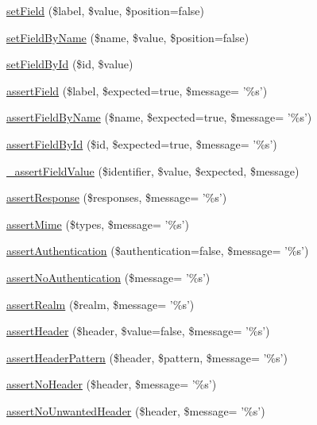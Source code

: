 \begin{DoxyCompactItemize}
\item 
\hyperlink{class_web_test_case_a2b8f21394a225f1386c22f671a6debc0}{setField} (\$label, \$value, \$position=false)
\item 
\hyperlink{class_web_test_case_ab3d6b5e72b290f14f51148642f1681e4}{setFieldByName} (\$name, \$value, \$position=false)
\item 
\hyperlink{class_web_test_case_a677f77692fd67768ad837a258a7ef4fd}{setFieldById} (\$id, \$value)
\item 
\hyperlink{class_web_test_case_a2ff4ade56d51b73cd30290456ee94d74}{assertField} (\$label, \$expected=true, \$message= '\%s')
\item 
\hyperlink{class_web_test_case_abfdb01d4f19a545a174dc1989d1edc88}{assertFieldByName} (\$name, \$expected=true, \$message= '\%s')
\item 
\hyperlink{class_web_test_case_a5bb2fcfa5ff8540f77829901370ade99}{assertFieldById} (\$id, \$expected=true, \$message= '\%s')
\item 
\hyperlink{class_web_test_case_a4aaf6a1b573b4523fc02800eaf63ba90}{\_\-assertFieldValue} (\$identifier, \$value, \$expected, \$message)
\item 
\hyperlink{class_web_test_case_a974043ce5e246d9d61aa2432fa460118}{assertResponse} (\$responses, \$message= '\%s')
\item 
\hyperlink{class_web_test_case_ad3447866f2462d2efd18e70657ff19ee}{assertMime} (\$types, \$message= '\%s')
\item 
\hyperlink{class_web_test_case_a1cf868c95aec441290995d71aba42f0a}{assertAuthentication} (\$authentication=false, \$message= '\%s')
\item 
\hyperlink{class_web_test_case_aa3d977b11d4cd690ad1644b0103de9d1}{assertNoAuthentication} (\$message= '\%s')
\item 
\hyperlink{class_web_test_case_acc61e0a6d07f19005ee26e1cf98b813b}{assertRealm} (\$realm, \$message= '\%s')
\item 
\hyperlink{class_web_test_case_a62b3bb8ba4a2f6439a336e69fe60e40e}{assertHeader} (\$header, \$value=false, \$message= '\%s')
\item 
\hyperlink{class_web_test_case_ae5e82c9a2219c4aa1d65d42b8a7286a0}{assertHeaderPattern} (\$header, \$pattern, \$message= '\%s')
\item 
\hyperlink{class_web_test_case_aaad06de3e0ed7fb74081ff9a6633a3fb}{assertNoHeader} (\$header, \$message= '\%s')
\item 
\hyperlink{class_web_test_case_aa12793f1d62d25ae5748063e26a9a513}{assertNoUnwantedHeader} (\$header, \$message= '\%s')

\end{DoxyCompactItemize}
